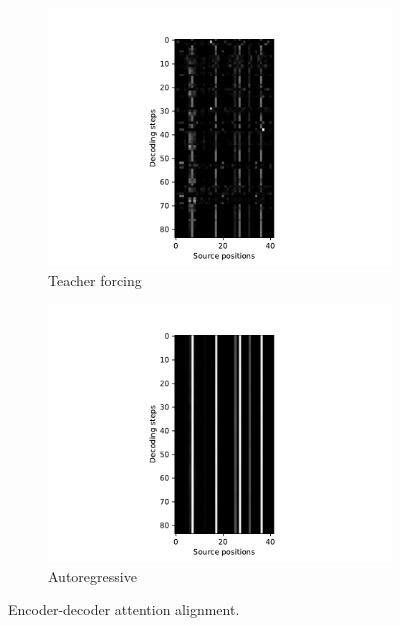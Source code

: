 \documentclass[11pt]{article}
\begin{document}
\begin{figure}
  \begin{subfigure}{0.5\textwidth}
    \centering
    \includegraphics[width=\textwidth, trim={3cm 0 3cm 0}, clip]{image/attention_forcing.pdf}
    \caption*{Teacher forcing}
  \end{subfigure}%
  \begin{subfigure}{0.5\textwidth}
    \centering
    \includegraphics[width=\textwidth, trim={3cm 0 3cm 0}, clip]{image/attention_autoreg.pdf}
    \caption*{Autoregressive}
  \end{subfigure}
  \caption{\label{fig:att-decoder}Encoder-decoder attention alignment.}
\end{figure}
\end{document}
